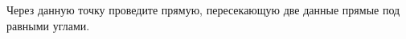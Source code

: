 \begin{ex}
	\begin{condition}
		Через данную точку проведите прямую, пересекающую две данные прямые под равными углами.
	\end{condition}
\end{ex}